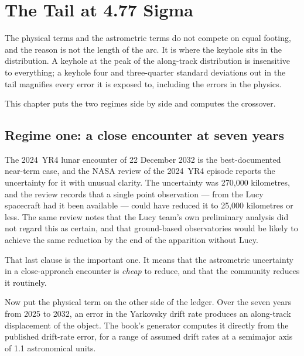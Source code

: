 
\chapter{The Tail at 4.77 Sigma}
\label{ch:tail}

The physical terms and the astrometric terms do not compete on equal
footing, and the reason is not the length of the arc. It is where the
keyhole sits in the distribution. A keyhole at the peak of the along-track
distribution is insensitive to everything; a keyhole four and three-quarter
standard deviations out in the tail magnifies every error it is exposed to,
including the errors in the physics.

This chapter puts the two regimes side by side and computes the crossover.

\section{Regime one: a close encounter at seven years}

The 2024~YR4 lunar encounter of 22 December 2032 is the best-documented
near-term case, and the NASA review of the 2024~YR4 episode reports the
 uncertainty for it with unusual clarity. The uncertainty was 270,000
kilometres, and the review records that a single point observation --- from
the Lucy spacecraft had it been available --- could have reduced it to
25,000 kilometres or less. The same review notes that the Lucy team's own
preliminary analysis did not regard this as certain, and that ground-based
observatories would be likely to achieve the same reduction by the end of the
apparition without Lucy.

That last clause is the important one. It means that the astrometric
uncertainty in a close-approach encounter is \emph{cheap} to reduce, and
that the community reduces it routinely.

Now put the physical term on the other side of the ledger. Over the seven
years from 2025 to 2032, an error in the Yarkovsky drift rate produces an
along-track displacement of the object. The book's generator computes it
directly from the published drift-rate error, for a range of assumed drift
rates at a semimajor axis of 1.1 astronomical units.

